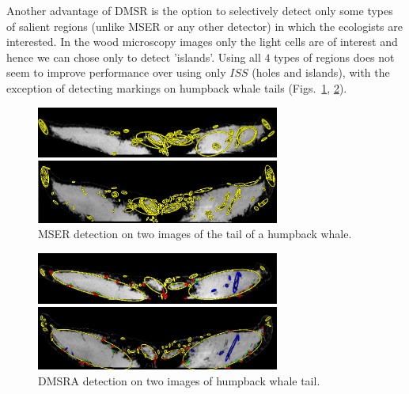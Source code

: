 \documentclass[conference,compsoc]{IEEEtran}
\begin{document}
Another advantage of DMSR is the option to selectively detect only some types of salient regions (unlike MSER or any other detector) in which the ecologists are interested. In the wood microscopy images only the light cells are of interest and hence we can chose only to detect 'islands'. Using all $4$ types of regions does not seem to improve performance over using only $ISS$ (holes and islands), with the exception of detecting markings on humpback whale tails (Figs.~\ref{fig:tails_mser}, \ref{fig:tails_dmsr}). 

\begin{figure}[htb]

\begin{minipage}[b]{.99\linewidth}
  \centering
  \centerline{\includegraphics[width=8cm]{mserTailA}}
\end{minipage}
\vspace{0.1cm}
\begin{minipage}[b]{0.99\linewidth}
  \centering
  \centerline{\includegraphics[width=8cm]{mserTailB}}
\end{minipage}
\hfill
\caption{MSER detection on two images of the tail of a humpback whale. }
\label{fig:tails_mser}
\vspace{-0.3cm}
\end{figure}

\begin{figure}[htb]

\begin{minipage}[b]{.99\linewidth}
  \centering
  \centerline{\includegraphics[width=8cm]{dmsrTailA}}
\end{minipage}
\vspace{0.1cm}
\begin{minipage}[b]{0.99\linewidth}
  \centering
  \centerline{\includegraphics[width=8cm]{dmsrTailB}}
\end{minipage}
\hfill
\caption{DMSRA detection on two images of humpback whale tail. }
\label{fig:tails_dmsr}
\vspace{-0.3cm}
\end{figure}
\end{document}
